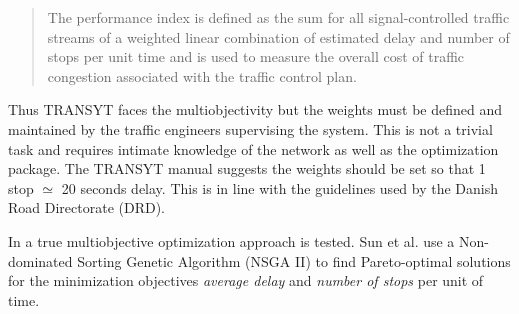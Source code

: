 \begin{quote}
The performance index is defined as the sum for all signal-controlled
traffic streams of a weighted linear combination of estimated delay
and number of stops per unit time and is used to measure the overall
cost of traffic congestion associated with the traffic control plan.
\end{quote}

Thus TRANSYT faces the multiobjectivity but the weights must be
defined and maintained by the traffic engineers supervising the
system. This is not a trivial task and requires intimate knowledge of
the network as well as the optimization package. The TRANSYT manual
suggests the weights should be set so that 1 stop $\simeq$ 20 seconds
delay. This is in line with the guidelines used by the Danish Road
Directorate (DRD).

In \cite{41} a true multiobjective optimization approach is
tested. Sun et al. use a Non-dominated Sorting Genetic Algorithm (NSGA
II) to find Pareto-optimal solutions for the minimization objectives
\textit{average delay} and \textit{number of stops} per unit of time.

